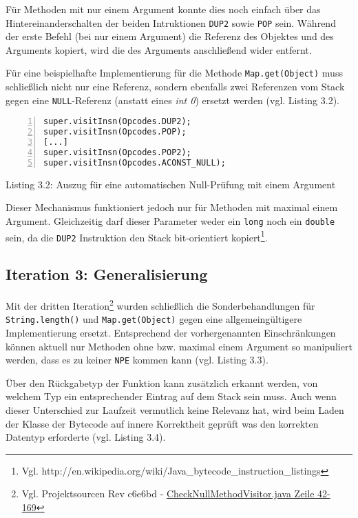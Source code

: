 Für Methoden mit nur einem Argument konnte dies noch einfach über das Hintereinanderschalten
der beiden Intruktionen \texttt{DUP2} sowie \texttt{POP} sein.
Während der erste Befehl (bei nur einem Argument) die Referenz des Objektes und des Arguments
kopiert, wird die des Arguments anschließend wider entfernt.

Für eine beispielhafte Implementierung für die Methode \texttt{Map.get(Object)}
muss schließlich nicht nur eine Referenz, sondern ebenfalls zwei Referenzen vom
Stack gegen eine \texttt{NULL}-Referenz (anstatt eines \emph{int 0}) ersetzt werden
(vgl. Listing 3.2).

\begin{lstlisting}[basicstyle=\ttfamily,numbers=left,numberstyle=\footnotesize\ttfamily,backgroundcolor=\color{source}]
super.visitInsn(Opcodes.DUP2);
super.visitInsn(Opcodes.POP);
[...]
super.visitInsn(Opcodes.POP2);
super.visitInsn(Opcodes.ACONST_NULL);
\end{lstlisting}
\centerline{Listing 3.2: Auszug für eine automatischen Null-Prüfung mit einem Argument}

\vspace{0.3cm}

Dieser Mechanismus funktioniert jedoch nur für Methoden mit maximal einem Argument.
Gleichzeitig darf dieser Parameter weder ein \texttt{long} noch ein \texttt{double} sein,
da die \texttt{DUP2} Instruktion den Stack bit-orientiert kopiert\footnote{Vgl. http://en.wikipedia.org/wiki/Java\_bytecode\_instruction\_listings}.

\subsection{Iteration 3: Generalisierung}

Mit der dritten Iteration\footnote{Vgl. Projektsourcen Rev c6e6bd - \href{https://github.com/jerolimov/java-hardener/blob/c6e6bdc7d081eae5e47d2c926073aa3715d908f6/src/main/java/de/fhkoeln/gm/cui/javahardener/CheckNullMethodVisitor.java\#L42-169}{CheckNullMethodVisitor.java Zeile 42-169}}
wurden schließlich die Sonderbehandlungen für \texttt{String.length()} und
\texttt{Map.get(Object)} gegen eine allgemeingültigere Implementierung ersetzt.
Entsprechend der vorhergenannten Einschränkungen können aktuell nur Methoden ohne
bzw. maximal einem Argument so manipuliert werden, dass es zu keiner \texttt{NPE} kommen kann
(vgl. Listing 3.3).

Über den Rückgabetyp der Funktion kann zusätzlich erkannt werden, von
welchem Typ ein entsprechender Eintrag auf dem Stack sein muss.
Auch wenn dieser Unterschied zur Laufzeit vermutlich keine Relevanz hat,
wird beim Laden der Klasse der Bytecode auf innere Korrektheit geprüft
was den korrekten Datentyp erforderte (vgl. Listing 3.4).

